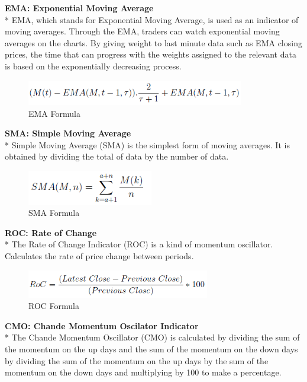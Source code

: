 \documentclass{article}
\begin{document}
\noindent
\textbf{EMA: Exponential Moving Average} \\*
EMA, which stands for Exponential Moving Average, is used as an indicator of moving averages. Through the EMA, traders can watch exponential moving averages on the charts. By giving weight to last minute data such as EMA closing prices, the time that can progress with the weights assigned to the relevant data is based on the exponentially decreasing process.
\begin{figure}[H]
\begin{center}
   \includegraphics[width=95mm,scale=0.8]{assets/formulas/ema.png}
   \caption{EMA Formula}
\end{center}
\end{figure}
\noindent
\textbf{SMA: Simple Moving Average} \\*
Simple Moving Average (SMA) is the simplest form of moving averages. It is obtained by dividing the total of data by the number of data.
\begin{figure}[H]
\begin{center}
   \includegraphics[width=55mm,scale=0.8]{assets/formulas/sma.png}
   \caption{SMA Formula}
\end{center}
\end{figure}
\noindent
\textbf{ROC: Rate of Change}\\*
The Rate of Change Indicator (ROC) is a kind of momentum oscillator. Calculates the rate of price change between periods.
\begin{figure}[H]
\begin{center}
   \includegraphics[width=80mm,scale=0.8]{assets/formulas/roc.png}
   \caption{ROC Formula}
\end{center}
\end{figure}
\noindent
\textbf{CMO: Chande Momentum Oscilator Indicator} \\*
The Chande Momentum Oscillator (CMO) is calculated by dividing the sum of the momentum on the up days and the sum of the momentum on the down days by dividing the sum of the momentum on the up days by the sum of the momentum on the down days and multiplying by 100 to make a percentage.
\end{document}
